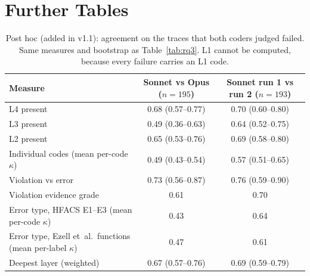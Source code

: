 \documentclass[11pt]{article}
\begin{document}
\section{Further Tables}
\label{app:tables}

\begin{table}[tbp]
\centering
\caption{Post hoc (added in v1.1): agreement on the traces that both coders judged failed. Same measures and bootstrap as Table~\ref{tab:rq3}. L1 cannot be computed, because every failure carries an L1 code.}
\label{tab:bothfailed}
\small
\begin{tabular}{@{}lcc@{}}
\toprule
Measure & Sonnet vs Opus ($n=195$) & Sonnet run 1 vs run 2 ($n=193$)\\
\midrule
L4 present & 0.68 (0.57--0.77) & 0.70 (0.60--0.80)\\
L3 present & 0.49 (0.36--0.63) & 0.64 (0.52--0.75)\\
L2 present & 0.65 (0.53--0.76) & 0.69 (0.58--0.80)\\
Individual codes (mean per-code $\kappa$) & 0.49 (0.43--0.54) & 0.57 (0.51--0.65)\\
Violation vs error & 0.73 (0.56--0.87) & 0.76 (0.59--0.90)\\
Violation evidence grade & 0.61 & 0.70\\
Error type, HFACS E1--E3 (mean per-code $\kappa$) & 0.43 & 0.64\\
Error type, Ezell et~al.\ functions (mean per-label $\kappa$) & 0.47 & 0.61\\
Deepest layer (weighted) & 0.67 (0.57--0.76) & 0.69 (0.59--0.79)\\
\bottomrule
\end{tabular}
\end{table}
\end{document}
